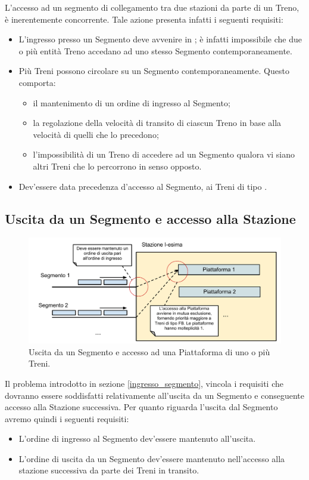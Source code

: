 	L'accesso ad un segmento di collegamento tra due stazioni da parte di un Treno, è inerentemente concorrente. Tale azione presenta infatti i seguenti requisiti:
		\begin{itemize}
			\item L'ingresso presso un Segmento deve avvenire in ; è infatti impossibile che due o più entità Treno accedano ad uno stesso Segmento contemporaneamente.
			\item Più Treni possono circolare su un Segmento contemporaneamente. Questo comporta:
				\begin{itemize}
					\item il mantenimento di un ordine di ingresso al Segmento;
					\item la regolazione della velocità di transito di ciascun Treno in base alla velocità di quelli che lo precedono;
					\item l'impossibilità di un Treno di accedere ad un Segmento qualora vi siano altri Treni che lo percorrono in senso opposto.
				\end{itemize}
			\item Dev'essere data precedenza d'accesso al Segmento, ai Treni di tipo .
		\end{itemize}


	\subsection{Uscita da un Segmento e accesso alla Stazione}

	\begin{figure}[htbp]
		\includegraphics[width=\textwidth,keepaspectratio]{imgs/Ingresso_Stazione.pdf}
		\caption{\footnotesize{Uscita da un Segmento e accesso ad una Piattaforma di uno o più Treni.}}
	\end{figure}

	Il problema introdotto in sezione \ref{ingresso_segmento}, vincola i requisiti che dovranno essere soddisfatti relativamente all'uscita da un Segmento e conseguente accesso alla Stazione successiva. Per quanto riguarda l'uscita dal Segmento avremo quindi i seguenti requisiti:
		\begin{itemize}
			\item L'ordine di ingresso al Segmento dev'essere mantenuto all'uscita. 
			\item L'ordine di uscita da un Segmento dev'essere mantenuto nell'accesso alla stazione successiva da parte dei Treni in transito.
		\end{itemize}

